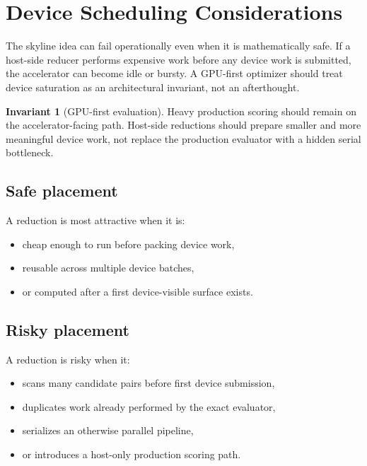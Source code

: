 \documentclass[11pt,oneside]{article}
\theoremstyle{definition}
\newtheorem{invariant}{Invariant}[section]
\begin{document}
\section{Device Scheduling Considerations}

The skyline idea can fail operationally even when it is mathematically safe. If a host-side reducer performs expensive work before any device work is submitted, the accelerator can become idle or bursty. A GPU-first optimizer should treat device saturation as an architectural invariant, not an afterthought.

\begin{invariant}[GPU-first evaluation]
Heavy production scoring should remain on the accelerator-facing path. Host-side reductions should prepare smaller and more meaningful device work, not replace the production evaluator with a hidden serial bottleneck.
\end{invariant}

\subsection{Safe placement}
A reduction is most attractive when it is:
\begin{itemize}
  \item cheap enough to run before packing device work,
  \item reusable across multiple device batches,
  \item or computed after a first device-visible surface exists.
\end{itemize}

\subsection{Risky placement}
A reduction is risky when it:
\begin{itemize}
  \item scans many candidate pairs before first device submission,
  \item duplicates work already performed by the exact evaluator,
  \item serializes an otherwise parallel pipeline,
  \item or introduces a host-only production scoring path.
\end{itemize}
\end{document}
